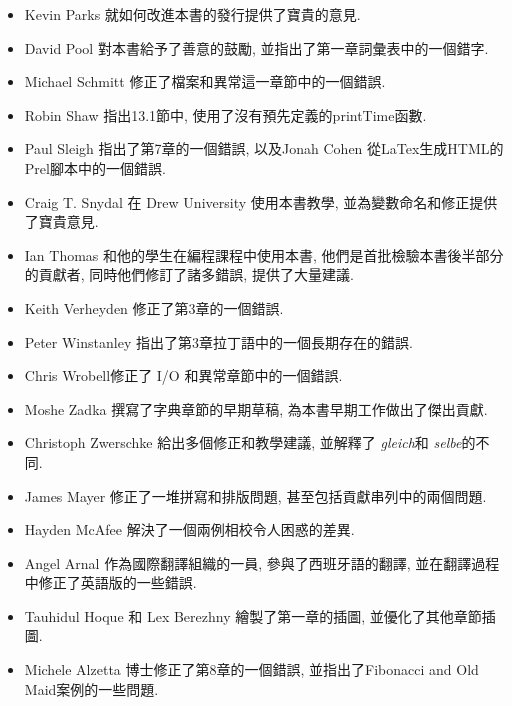 \documentclass[10pt]{book}
\begin{document}
\begin{itemize}
\item Kevin Parks 就如何改進本書的發行提供了寶貴的意見. 

\item David Pool 對本書給予了善意的鼓勵, 並指出了第一章詞彙表中的一個錯字. 

\item Michael Schmitt 修正了檔案和異常這一章節中的一個錯誤. 

\item Robin Shaw 指出13.1節中, 使用了沒有預先定義的printTime函數. 

\item Paul Sleigh 指出了第7章的一個錯誤, 
以及Jonah Cohen 從LaTex生成HTML的Prel腳本中的一個錯誤. 

\item Craig T. Snydal 在 Drew University 使用本書教學, 
並為變數命名和修正提供了寶貴意見. 

\item Ian Thomas 和他的學生在編程課程中使用本書, 
他們是首批檢驗本書後半部分的貢獻者, 同時他們修訂了諸多錯誤, 提供了大量建議. 

\item Keith Verheyden 修正了第3章的一個錯誤. 

\item Peter Winstanley 指出了第3章拉丁語中的一個長期存在的錯誤. 

\item Chris Wrobell修正了 I/O 和異常章節中的一個錯誤. 

\item Moshe Zadka 撰寫了字典章節的早期草稿, 為本書早期工作做出了傑出貢獻. 

\item Christoph Zwerschke 給出多個修正和教學建議, 並解釋了
 {\em gleich}和 {\em selbe}的不同. 

\item James Mayer 修正了一堆拼寫和排版問題, 甚至包括貢獻串列中的兩個問題. 

\item Hayden McAfee 解決了一個兩例相校令人困惑的差異. 

\item Angel Arnal 作為國際翻譯組織的一員, 參與了西班牙語的翻譯, 
並在翻譯過程中修正了英語版的一些錯誤. 

\item Tauhidul Hoque 和 Lex Berezhny 繪製了第一章的插圖, 並優化了其他章節插圖. 

\item Michele Alzetta 博士修正了第8章的一個錯誤, 
並指出了Fibonacci and Old Maid案例的一些問題. 


\end{itemize}
\end{document}
